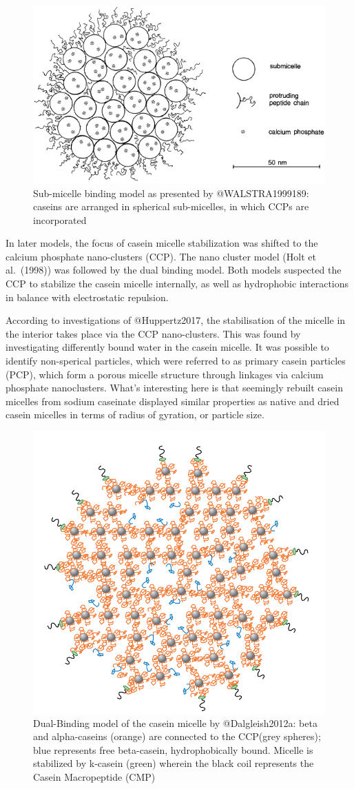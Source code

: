 \documentclass[
]{article}
\begin{document}
\begin{figure}
\includegraphics[width=0.5\linewidth]{images/micelle_Walstra} \caption{Sub-micelle binding model as presented by @WALSTRA1999189: caseins are arranged in spherical sub-micelles, in which CCPs are incorporated}\label{fig:unnamed-chunk-2}
\end{figure}

In later models, the focus of casein micelle stabilization was shifted
to the calcium phosphate nano-clusters (CCP). The nano cluster model
(Holt et al.~(1998)) was followed by the dual binding model. Both models
suspected the CCP to stabilize the casein micelle internally, as well as
hydrophobic interactions in balance with electrostatic repulsion.

According to investigations of @Huppertz2017, the stabilisation of the
micelle in the interior takes place via the CCP nano-clusters. This was
found by investigating differently bound water in the casein micelle. It
was possible to identify non-sperical particles, which were referred to
as primary casein particles (PCP), which form a porous micelle structure
through linkages via calcium phosphate nanoclusters. What's interesting
here is that seemingly rebuilt casein micelles from sodium caseinate
displayed similar properties as native and dried casein micelles in
terms of radius of gyration, or particle size.

\begin{figure}
\includegraphics[width=0.5\linewidth]{images/micelle_Dalgleish} \caption{Dual-Binding model of the casein micelle by @Dalgleish2012a: beta and alpha-caseins (orange) are connected to the CCP(grey spheres); blue represents free beta-casein, hydrophobically bound. Micelle is stabilized by k-casein (green) wherein the black coil represents the Casein Macropeptide (CMP) }\label{fig:unnamed-chunk-3}
\end{figure}
\end{document}

